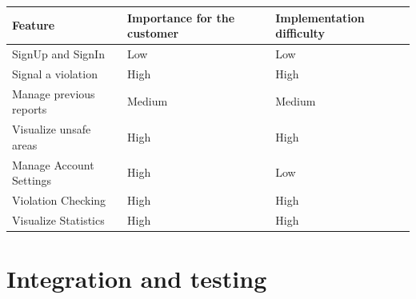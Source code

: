     \begin{table}[]
        \begin{tabular}{|l|l|l|}
            \hline
            \textbf{Feature} & \textbf{Importance for the customer}  &
            \textbf{Implementation difficulty}  \\ \hline
            SignUp and SignIn & Low  & Low  \\ \hline
            Signal a violation & High  & High  \\ \hline
            Manage previous reports & Medium  & Medium  \\ \hline
            Visualize unsafe areas & High & High  \\ \hline
            Manage Account Settings & High & Low  \\ \hline
            Violation Checking & High & High  \\ \hline
            Visualize Statistics & High & High  \\ \hline
        \end{tabular}
    \end{table}
    
    \newpage
    \section{Integration and testing}
